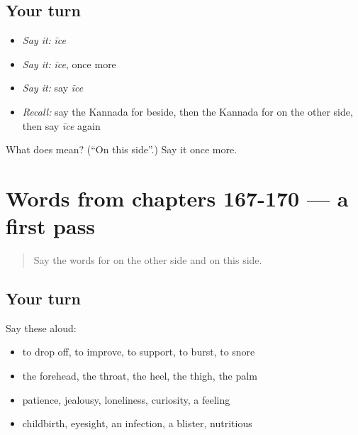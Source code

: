 \subsection*{Your turn}
\begin{itemize}
\raggedright
  \item \emph{Say it:} \emph{īce}
  \item \emph{Say it:} \emph{īce}, once more
  \item \emph{Say it:} say \emph{īce}
  \item \emph{Recall:} say the Kannada for beside, then the Kannada for on the other side, then say \emph{īce} again
\end{itemize}

\begin{tcolorbox}[breakable,colback=teal!4,colframe=teal!35!black,title={Before you move on}]
What does  mean? (\textquotedblleft{}On this side\textquotedblright{}.) Say it once more.
\end{tcolorbox}
\section[(dialogue)]{Words from chapters 167-170 — a first pass}

\label{lesson:KA-R175-first-pass-words-from-chapters-167-170}



\begin{quote}
Say the words for on the other side and on this side.
\end{quote}

\subsection*{Your turn}
Say these aloud:

\begin{itemize}
\raggedright
  \item to drop off, to improve, to support, to burst, to snore
  \item the forehead, the throat, the heel, the thigh, the palm
  \item patience, jealousy, loneliness, curiosity, a feeling
  \item childbirth, eyesight, an infection, a blister, nutritious
\end{itemize}

